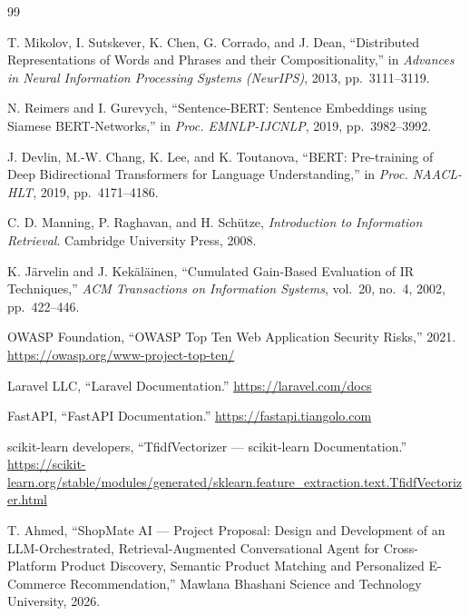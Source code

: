 \documentclass[12pt,a4paper]{report}
\begin{document}
\begin{thebibliography}{99}

 T. Mikolov, I. Sutskever, K. Chen, G. Corrado, and J. Dean, ``Distributed
Representations of Words and Phrases and their Compositionality,'' in \textit{Advances in Neural
Information Processing Systems (NeurIPS)}, 2013, pp.~3111--3119.

 N. Reimers and I. Gurevych, ``Sentence-BERT: Sentence Embeddings using Siamese
BERT-Networks,'' in \textit{Proc. EMNLP-IJCNLP}, 2019, pp.~3982--3992.

 J. Devlin, M.-W. Chang, K. Lee, and K. Toutanova, ``BERT: Pre-training of Deep
Bidirectional Transformers for Language Understanding,'' in \textit{Proc. NAACL-HLT}, 2019,
pp.~4171--4186.

 C. D. Manning, P. Raghavan, and H. Sch\"utze, \textit{Introduction to Information
Retrieval}. Cambridge University Press, 2008.

 K. J\"arvelin and J. Kek\"al\"ainen, ``Cumulated Gain-Based Evaluation of IR
Techniques,'' \textit{ACM Transactions on Information Systems}, vol.~20, no.~4, 2002, pp.~422--446.

 OWASP Foundation, ``OWASP Top Ten Web Application Security Risks,'' 2021.
\url{https://owasp.org/www-project-top-ten/}

 Laravel LLC, ``Laravel Documentation.'' \url{https://laravel.com/docs}

 FastAPI, ``FastAPI Documentation.'' \url{https://fastapi.tiangolo.com}

 scikit-learn developers, ``TfidfVectorizer --- scikit-learn Documentation.''
\url{https://scikit-learn.org/stable/modules/generated/sklearn.feature_extraction.text.TfidfVectorizer.html}

 T. Ahmed, ``ShopMate AI --- Project Proposal: Design and Development of an
LLM-Orchestrated, Retrieval-Augmented Conversational Agent for Cross-Platform Product Discovery, Semantic
Product Matching and Personalized E-Commerce Recommendation,'' Mawlana Bhashani Science and Technology
University, 2026.

\end{thebibliography}
\end{document}
